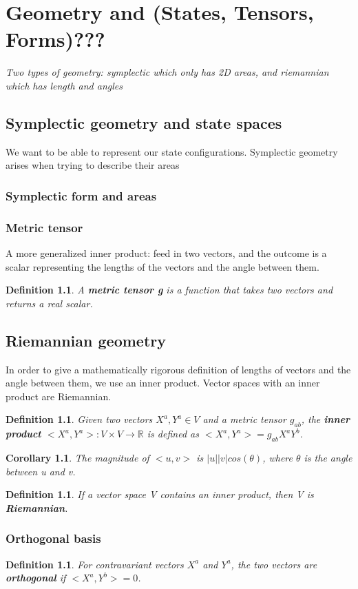 \documentclass{book}
\newtheorem{defn}[equation]{Definition}
\newtheorem{coro}[equation]{Corollary}
\begin{document}
\chapter{Geometry and (States, Tensors, Forms)???}

\emph{Two types of geometry: symplectic which only has 2D areas, and riemannian which has length and angles}


\section{Symplectic geometry and state spaces}
We want to be able to represent our state configurations. Symplectic geometry arises when trying to describe their areas

\subsection{Symplectic form and areas}



\subsection{Metric tensor}
A more generalized inner product: feed in two vectors, and the outcome is a scalar representing the lengths of the vectors and the angle between them. 

\begin{defn}
	A \textbf{metric tensor g} is a function that takes two vectors and returns a real scalar. 
\end{defn}


\section{Riemannian geometry}
In order to give a mathematically rigorous definition of lengths of vectors and the angle between them, we use an inner product. Vector spaces with an inner product are Riemannian.

\begin{defn}
	Given two vectors $X^a,Y^a \in V$ and a metric tensor $g_{ab}$, the \textbf{inner product} $<X^a,Y^a> : V \times V \to \mathbb{R}$ is defined as $<X^a,Y^a> = g_{ab}X^aY^b$. 
\end{defn}

\begin{coro}
	The magnitude of $<u,v>$ is $|u||v|cos(\theta)$, where $\theta$ is the angle between u and v. 
\end{coro}

\begin{defn}
	If a vector space V contains an inner product, then V is \textbf{Riemannian}.
	\end{defn}



\subsection{Orthogonal basis}

\begin{defn}
	For contravariant vectors $X^a$ and $Y^a$, the two vectors are \textbf{orthogonal} if $<X^a,Y^b> = 0$. 
\end{defn}
\end{document}
